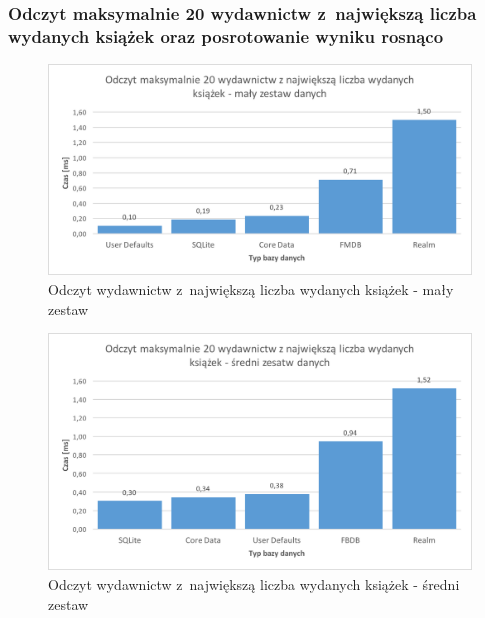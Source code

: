 \subsubsection{Odczyt maksymalnie 20 wydawnictw z~największą liczba wydanych książek oraz posrotowanie wyniku rosnąco}

\begin{figure}[H]
\centering
	\includegraphics[width=13.5cm]{img/read_data/read_by_publishers/read_by_publishers_small_test.png}
	\caption{Odczyt wydawnictw z~największą liczba wydanych książek - mały zestaw}
	\label{fig: read-by-publishers-small}
\end{figure}

\begin{figure}[H]
\centering
	\includegraphics[width=13.5cm]{img/read_data/read_by_publishers/read_by_publishers_medium_test.png}
	\caption{Odczyt wydawnictw z~największą liczba wydanych książek - średni zestaw}
	\label{fig: read-by-publishers-medium}
\end{figure}

